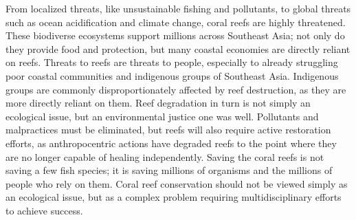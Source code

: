 \documentclass{book}\usepackage{knitr}
\begin{document}
\begin{knitrout}
\begin{kframe}
From localized threats, like unsustainable fishing and pollutants, to global threats such as ocean acidification and climate change, coral reefs are highly threatened. These biodiverse ecosystems support millions across Southeast Asia; not only do they provide food and protection, but many coastal economies are directly reliant on reefs. Threats to reefs are threats to people, especially to already struggling poor coastal communities and indigenous groups of Southeast Asia. Indigenous groups are commonly disproportionately affected by reef destruction, as they are more directly reliant on them. Reef degradation in turn is not simply an ecological issue, but an environmental justice one was well. Pollutants and malpractices must be eliminated, but reefs will also require active restoration efforts, as anthropocentric actions have degraded reefs to the point where they are no longer capable of healing independently. Saving the coral reefs is not saving a few fish species; it is saving millions of organisms and the millions of people who rely on them. Coral reef conservation should not be viewed simply as an ecological issue, but as a complex problem requiring multidisciplinary efforts to achieve success.



\end{kframe}
\end{knitrout}
\end{document}
